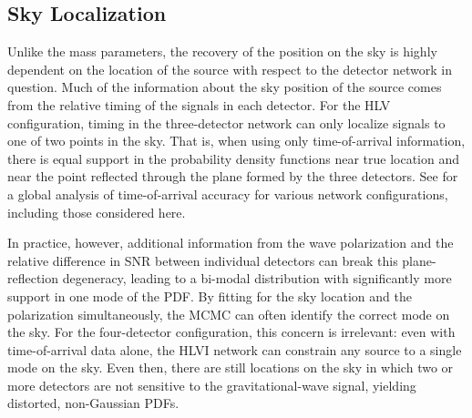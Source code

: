 \documentclass[11pt,a4paper]{emulateapj} 
\begin{document}
\subsection{Sky Localization}
\label{skySection}
 
Unlike the mass parameters, the recovery of the position on the sky is
highly dependent on the location of the source with respect to the
detector network in question.  Much of the information about the sky
position of the source comes from the relative timing of the signals
in each detector.  For the HLV configuration, timing in the
three-detector network can only localize signals to one of two points
in the sky.  That is, when using only time-of-arrival information,
there is equal support in the probability density functions near true
location and near the point reflected through the plane formed by the
three detectors.  See \cite{Fairhurst2011} for a global analysis of
time-of-arrival accuracy for various network configurations, including
those considered here.
  
  
In practice, however, additional information from the wave
polarization and the relative difference in SNR between individual
detectors can break this plane-reflection degeneracy, leading to a
bi-modal distribution with significantly more support in one mode of
the PDF.  By fitting for the sky location and the polarization
simultaneously, the MCMC can often identify the correct mode on the
sky.  For the four-detector configuration, this concern is irrelevant:
even with time-of-arrival data alone, the HLVI network can constrain
any source to a single mode on the sky.  Even then, there are still
locations on the sky in which two or more detectors are not sensitive
to the gravitational-wave signal, yielding distorted, non-Gaussian
PDFs.
\end{document}
